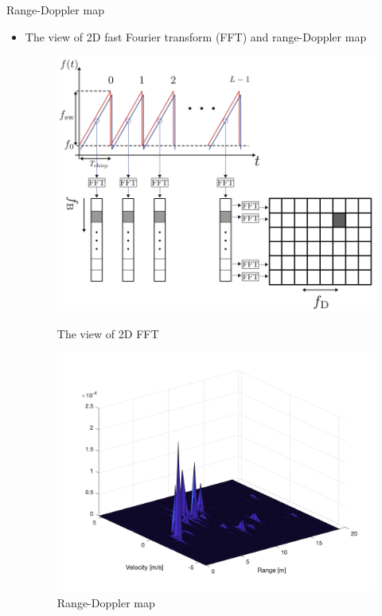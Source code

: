 \documentclass{beamer}
\begin{document}
\begin{frame}[t]{Range-Doppler map}
    \begin{itemize}
        \item The view of 2D fast Fourier transform (FFT) and range-Doppler map
         \vspace{0.5\baselineskip}
            \begin{figure}
                \centering
                \begin{minipage}{0.45\textwidth}
                    \centering
                    \includegraphics[height=0.8\textwidth]{figures/2D_FFT.png}
                    \caption{The view of 2D FFT \cite{kronauge_new_2014}}
                \end{minipage}
                \begin{minipage}{0.45\textwidth}
                    \centering
                    \includegraphics[height=0.8\textwidth]{figures/2r_furniture.png}
                    \caption{Range-Doppler map}
                \end{minipage}
            \end{figure}
    \end{itemize}
\end{frame}
\end{document}
